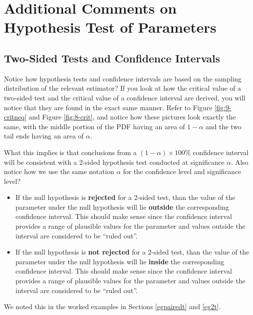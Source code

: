 \documentclass[
]{book}
\theoremstyle{definition}
\theoremstyle{definition}
\theoremstyle{definition}
\theoremstyle{definition}
\theoremstyle{remark}
\begin{document}
\hypertarget{infcomments}{%
\section{Additional Comments on Hypothesis Test of Parameters}\label{infcomments}}

\hypertarget{inference}{%
\subsection{Two-Sided Tests and Confidence Intervals}\label{inference}}

Notice how hypothesis tests and confidence intervals are based on the sampling distribution of the relevant estimator? If you look at how the critical value of a two-sided test and the critical value of a confidence interval are derived, you will notice that they are found in the exact same manner. Refer to Figure \ref{fig:9-critneq} and Figure \ref{fig:8-crit}, and notice how these pictures look exactly the same, with the middle portion of the PDF having an area of \(1-\alpha\) and the two tail ends having an area of \(\alpha\).

What this implies is that conclusions from a \((1-\alpha) \times 100\%\) confidence interval will be consistent with a 2-sided hypothesis test conducted at significance \(\alpha\). Also notice how we use the same notation \(\alpha\) for the confidence level and significance level?

\begin{itemize}
\item
  If the null hypothesis is \textbf{rejected} for a 2-sided test, than the value of the parameter under the null hypothesis will lie \textbf{outside} the corresponding confidence interval. This should make sense since the confidence interval provides a range of plausible values for the parameter and values outside the interval are considered to be ``ruled out''.
\item
  If the null hypothesis is \textbf{not rejected} for a 2-sided test, than the value of the parameter under the null hypothesis will lie \textbf{inside} the corresponding confidence interval. This should make sense since the confidence interval provides a range of plausible values for the parameter and values outside the interval are considered to be ``ruled out''.
\end{itemize}

We noted this in the worked examples in Sections \ref{egpairedt} and \ref{eg2t}.
\end{document}
